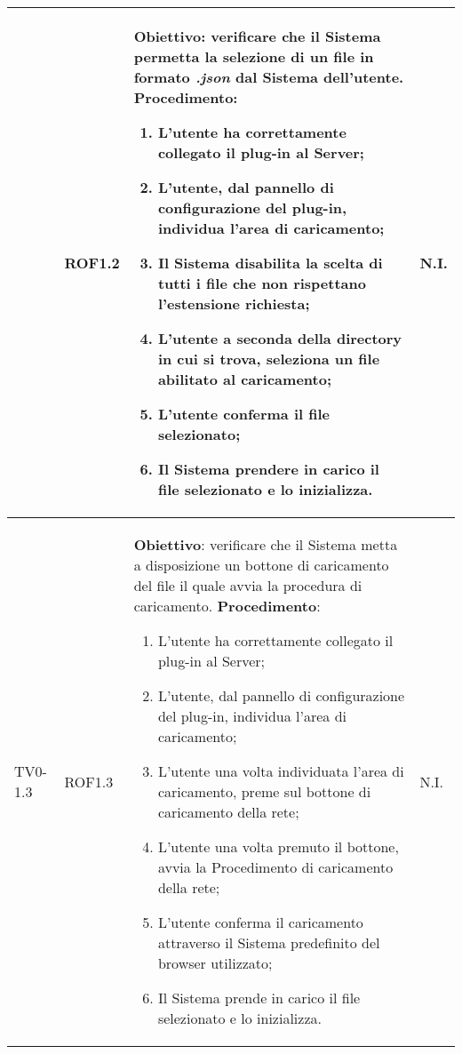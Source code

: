 \begin{longtable}{|C{.15\textwidth}|C{.13\textwidth}|m{.52\textwidth}|C{.08\textwidth}|}
   & ROF1.2 &
	\textbf{Obiettivo}: verificare che il Sistema permetta la selezione di un file in formato \textit{.json} dal Sistema dell'utente.\newline
	\textbf{Procedimento}:
	\begin{enumerate}
		\item L'utente ha correttamente collegato il plug-in al Server;
		\item L'utente, dal pannello di configurazione del plug-in, individua l'area di caricamento;
		\item Il Sistema disabilita la scelta di tutti i file che non rispettano l'estensione richiesta;
		\item L'utente a seconda della directory in cui si trova, seleziona un file abilitato al caricamento;
		\item L'utente conferma il file selezionato;
		\item Il Sistema prendere in carico il file selezionato e lo inizializza.
	\end{enumerate}
	& N.I. \\
\hline

 TV0-1.3 & ROF1.3 &
	\textbf{Obiettivo}: verificare che il Sistema metta a disposizione un bottone di caricamento del file il quale avvia la procedura di caricamento. \newline
	\textbf{Procedimento}:
	\begin{enumerate}
		\item L'utente ha correttamente collegato il plug-in al Server;
		\item L'utente, dal pannello di configurazione del plug-in, individua l'area di caricamento;
		\item L'utente una volta individuata l'area di caricamento, preme sul bottone di caricamento della rete;
		\item L'utente una volta premuto il bottone, avvia la Procedimento di caricamento della rete;
		\item L'utente conferma il caricamento attraverso il Sistema predefinito del browser utilizzato;
		\item Il Sistema prende in carico il file selezionato e lo inizializza.
	\end{enumerate}
	& N.I. \\
\hline


\end{longtable}
